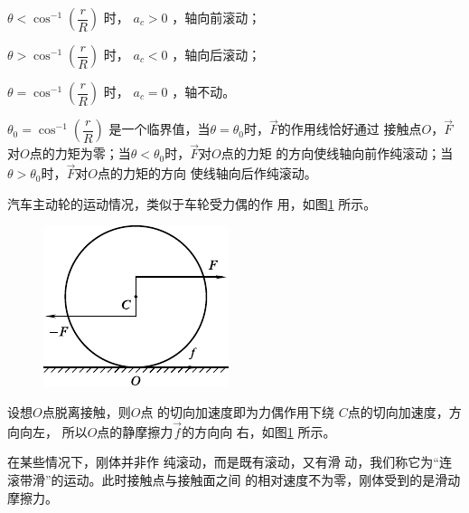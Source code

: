 $ \theta < \cos ^ { - 1 } \left( \dfrac { r } { R } \right) $ 时， $ a _ { c } > 0 $ ，轴向前滚动；

$ \theta > \cos ^ { - 1 } \left( \dfrac { r } { R } \right) $
时， $ a _ { c } < 0 $ ，轴向后滚动；

$ \theta = \cos ^ { - 1 } \left( \dfrac { r } { R } \right) $
时， $ a _ { c } = 0 $ ，轴不动。

$ \theta _ { 0 } = \cos ^ { - 1 } \left( \dfrac { r } { R } \right) $
是一个临界值，当$ \theta = \theta_{ 0 } $时，$ \vec{F} $的作用线恰好通过
接触点$ O $，$\vec{F}$对$ O $点的力矩为零；当$ \theta < \theta_{ 0 } $时，$ \vec{F} $对$ O $点的力矩
的方向使线轴向前作纯滚动；当$ \theta > \theta _ { 0 } $时，$\vec{F}$对$ O $点的力矩的方向
使线轴向后作纯滚动。

\clearpage
\example 汽车主动轮的运动情况，类似于车轮受力偶的作
用，如图\ref{fig:10.20} 所示。

\begin{figure}
  \vspace{-1.56em}
  \centering
  \includegraphics{figure/fig10.20}
  \caption{}
  \label{fig:10.20}
\end{figure}
设想$ O $点脱离接触，则$ O $点
的切向加速度即为力偶作用下绕
$ C $点的切向加速度，方向向左，
所以$ O $点的静摩擦力$\vec{f}$的方向向
右，如图\ref{fig:10.20} 所示。

在某些情况下，刚体并非作
纯滚动，而是既有滚动，又有滑
动，我们称它为“连滚带滑”的运动。此时接触点与接触面之间
的相对速度不为零，刚体受到的是滑动摩擦力。
